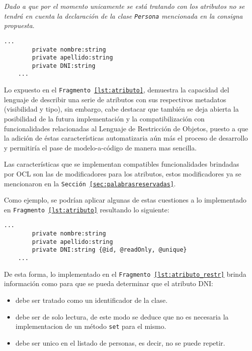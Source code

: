 \textit{Dado a que por el momento unicamente se está tratando con los atributos
no se tendrá en cuenta la declaración de la clase \texttt{Persona} mencionada
en la consigna propuesta}.

\begin{lstlisting}[caption={Director - Modelado de atributos}, label=lst:atributo]
  ...
		private nombre:string
		private apellido:string
		private DNI:string
	...
\end{lstlisting}

Lo expuesto en el \texttt{Fragmento \ref{lst:atributo}}, demuestra
la capacidad del lenguaje de describir una serie de atributos con sus
respectivos metadatos (visibilidad y tipo), sin embargo, cabe destacar que
también se deja abierta la posibilidad de la futura implementación y
la compatibilización con funcionalidades relacionadas al Lenguaje de
Restricción de Objetos, puesto a que la adición de éstas
características automatizaria aún más el proceso de
desarrollo y permitiría el pase de modelo-a-código de manera mas sencilla.

Las características que se implementan compatibles funcionalidades brindadas
por OCL son las de modificadores para los atributos, estos modificadores ya
se mencionaron en la \texttt{Sección \ref{sec:palabrasreservadas}}.

Como ejemplo, se podrían aplicar algunas de estas cuestiones a lo implementado
en \texttt{Fragmento \ref{lst:atributo}} resultando lo siguiente:

\begin{lstlisting}[caption={Director - Modelao de atributos (con OCL)},
label=lst:atributo_restr]
  ...
		private nombre:string
		private apellido:string
		private DNI:string {@id, @readOnly, @unique}
	...
\end{lstlisting}

De esta forma, lo implementado en el \texttt{Fragmento
\ref{lst:atributo_restr}} brinda información como para que se pueda determinar
que el atributo DNI:
\begin{itemize}
	\item debe ser tratado como un identificador de la clase.
	\item debe ser de solo lectura, de este modo se deduce que no es necesaria la
		implementacion de un método \texttt{set} para el mismo.
	\item debe ser unico en el listado de personas, es decir, no se puede
		repetir.
\end{itemize}

